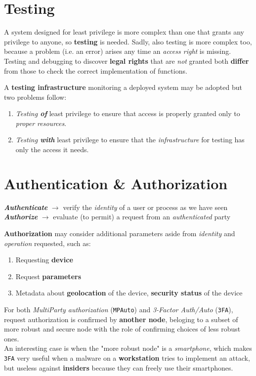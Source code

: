 \section{Testing}
A system designed for least privilege is more complex than one that grants any privilege to anyone,
so \textbf{testing} is needed.
Sadly, also testing is more complex too, because a problem (i.e. an error) arises any time an \textit{access right} is missing.
Testing and debugging to discover \textbf{legal rights} that are \textit{not} granted both
\textbf{differ} from those to check the correct implementation of functions.

A \textbf{testing infrastructure} monitoring a deployed system may be adopted but two problems follow:
\begin{enumerate}
   \item \textit{Testing \textbf{of}} least privilege to ensure that access is properly granted only to
   \textit{proper resources}.
   \item \textit{Testing \textbf{with}} least privilege to ensure that the \textit{infrastructure} for testing has only
   the access it needs.
\end{enumerate}

\section{Authentication \& Authorization}
\begin{center}
   \textit{\textbf{Authenticate}} $\longrightarrow$ verify the \textit{identity} of a user or process as we have seen\\
   \textit{\textbf{Authorize}} $\longrightarrow$ evaluate (to permit) a request from an \textit{authenticated} party
\end{center}
\textbf{Authorization} may consider additional parameters aside from \textit{identity} and \textit{operation} requested, such as:
\begin{enumerate}
   \item Requesting \textbf{device}
   \item Request \textbf{parameters}
   \item Metadata about \textbf{geolocation} of the device, \textbf{security status} of the device
\end{enumerate}

For both \textit{MultiParty authorization} (\texttt{MPAuto}) and \textit{3-Factor Auth/Auto} (\texttt{3FA}), 
request authorization is confirmed by \textbf{another node},
beloging to a subset of more robust and secure node with the role of confirming choices of less robust ones.\\
An interesting case is when the "more robust node" is a \textit{smartphone},
which makes \texttt{3FA} very useful when a malware on a \textbf{workstation} tries to implement an attack,
but useless against \textbf{insiders} because they can freely use their smartphones.

